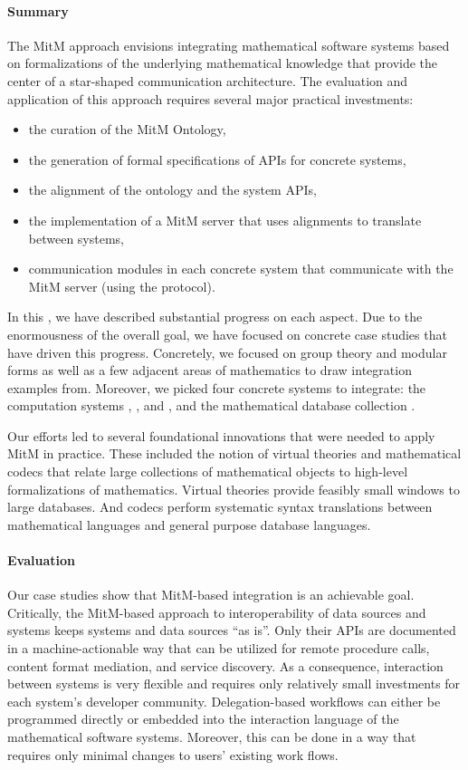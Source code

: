 \paragraph{Summary}
The MitM approach envisions integrating mathematical software systems based on formalizations of the underlying mathematical knowledge that provide the center of a star-shaped communication architecture.
The evaluation and application of this approach requires several major practical investments:
\begin{itemize}
\item the curation of the MitM Ontology,
\item the generation of formal specifications of APIs for concrete systems,
\item the alignment of the ontology and the system APIs,
\item the implementation of a MitM server that uses alignments to translate between systems,
\item communication modules in each concrete system that communicate with the MitM server (using the \SCSCP protocol).
\end{itemize}

In this \papertype, we have described substantial progress on each aspect.
Due to the enormousness of the overall goal, we have focused on concrete case studies that have driven this progress.
Concretely, we focused on group theory and modular forms as well as a few adjacent areas of mathematics to draw integration examples from.
Moreover, we picked four concrete systems to integrate: the computation systems \Sage, \GAP, and \Singular, and the mathematical database collection \lmfdb.

Our efforts led to several foundational innovations that were needed to apply MitM in practice.
These included the notion of virtual theories and mathematical codecs that relate large collections of mathematical objects to high-level formalizations of mathematics.
Virtual theories provide feasibly small windows to large databases.
And codecs perform systematic syntax translations between mathematical languages and general purpose database languages.

\paragraph{Evaluation} 

Our case studies show that MitM-based integration is an achievable goal.
Critically, the MitM-based approach to interoperability of data sources and systems keeps systems and data sources ``as is''.
Only their APIs are documented in a machine-actionable way that can be utilized for remote procedure calls, content format mediation, and service discovery.
As a consequence, interaction between systems is very flexible and requires only relatively small investments for each system's developer community.
Delegation-based workflows can either be programmed directly or embedded into the interaction language of the mathematical software systems.
Moreover, this can be done in a way that requires only minimal changes to users' existing work flows.

